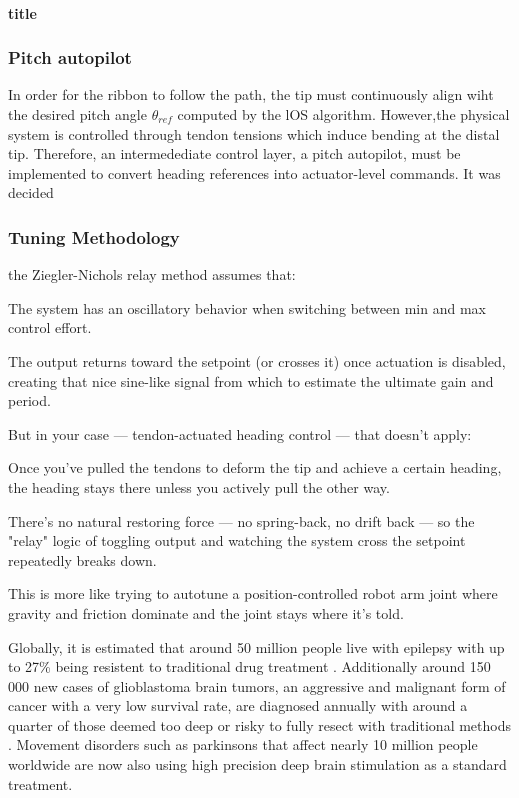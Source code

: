 \paragraph*{title}

\subsubsection{Pitch autopilot}
In order for the ribbon to follow the path, the tip must continuously align wiht the desired pitch angle \(\theta_{ref}\) computed by the lOS algorithm. However,the physical system is controlled through tendon tensions which induce bending at the distal tip. Therefore, an intermedediate control layer, a pitch autopilot, must be implemented to convert heading references into actuator-level commands.
\newline \newline
It was decided 

\subsubsection{Tuning Methodology}
the Ziegler-Nichols relay method assumes that:

The system has an oscillatory behavior when switching between min and max control effort.

The output returns toward the setpoint (or crosses it) once actuation is disabled, creating that nice sine-like signal from which to estimate the ultimate gain and period.

But in your case — tendon-actuated heading control — that doesn’t apply:

Once you've pulled the tendons to deform the tip and achieve a certain heading, the heading stays there unless you actively pull the other way.

There’s no natural restoring force — no spring-back, no drift back — so the "relay" logic of toggling output and watching the system cross the setpoint repeatedly breaks down.

This is more like trying to autotune a position-controlled robot arm joint where gravity and friction dominate and the joint stays where it's told.



Globally, it is estimated that around 50 million people live with epilepsy \cite{noauthor_epilepsy_nodate} with up to 27\% being resistent to traditional drug treatment \cite{sultana_incidence_2021}. Additionally around 150 000 new cases of glioblastoma brain tumors, an aggressive and malignant form of cancer with a very low survival rate, are diagnosed annually \cite{walsh_chapter_2016} with around a quarter of those deemed too deep or risky to fully resect with traditional methods \cite{vivas-buitrago_influence_2021}. Movement disorders such as parkinsons that affect nearly 10 million people worldwide are now also using high precision deep brain stimulation as a standard treatment.

